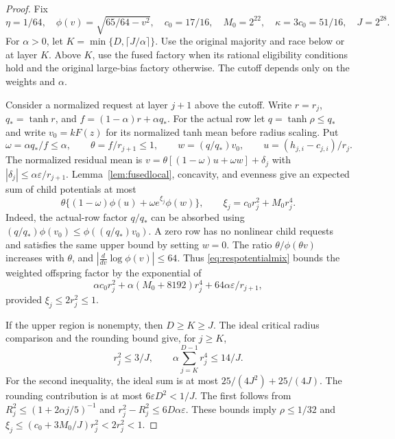 \begin{proof}
Fix
\[
\eta=1/64,\quad \phi(v)=\sqrt{65/64-v^2},\quad
c_0=17/16,\quad M_0=2^{22},\quad
\kappa=3c_0=51/16,\quad J=2^{28}.
\]
For $\alpha>0$, let $K=\min\{D,\lceil J/\alpha\rceil\}$.
Use the original majority and race below or at layer $K$.
Above $K$, use the fused factory when its rational eligibility
conditions hold and the original large-bias factory otherwise.
The cutoff depends only on the weights and $\alpha$.

Consider a normalized request at layer $j+1$ above the cutoff.
Write $r=r_j$, $q_*=\tanh r$, and
$f=(1-\alpha)r+\alpha q_*$. For the actual row let
$q=\tanh\rho\le q_*$ and write
$v_0=kF(z)$ for its normalized tanh mean before radius scaling.
Put
\[
\omega=\alpha q_*/f\le\alpha,\qquad
\theta=f/r_{j+1}\le1,\qquad
w=(q/q_*)v_0,\qquad
u=(h_{j,i}-c_{j,i})/r_j.
\]
The normalized residual mean is
$v=\theta[(1-\omega)u+\omega w]+\delta_j$ with
$|\delta_j|\le\alpha\varepsilon/r_{j+1}$.
Lemma~\ref{lem:fusedlocal}, concavity, and evenness give an
expected sum of child potentials at most
\[
\theta\{(1-\omega)\phi(u)+\omega e^{\xi_j}\phi(w)\},
\qquad
\xi_j=c_0r_j^2+M_0r_j^4.
\]
Indeed, the actual-row factor $q/q_*$ can be absorbed using
$(q/q_*)\phi(v_0)\le\phi((q/q_*)v_0)$.
A zero row has no nonlinear child requests and satisfies the
same upper bound by setting $w=0$.
The ratio $\theta/\phi(\theta v)$ increases with $\theta$,
and $|\frac d{dv}\log\phi(v)|\le64$.
Thus \eqref{eq:respotentialmix} bounds the weighted offspring
factor by the exponential of
\begin{equation}\label{eq:resweightedlocal}
\alpha c_0r_j^2+
\alpha(M_0+8192)r_j^4+
64\alpha\varepsilon/r_{j+1},
\end{equation}
provided $\xi_j\le2r_j^2\le1$.

If the upper region is nonempty, then $D\ge K\ge J$.
The ideal critical radius comparison and the rounding bound give,
for $j\ge K$,
\begin{equation}\label{eq:rescutoffbounds}
r_j^2\le3/J,
\qquad
\alpha\sum_{j=K}^{D-1}r_j^4\le14/J.
\end{equation}
For the second inequality, the ideal sum is at most
$25/(4J^2)+25/(4J)$. The rounding contribution is at most
$6\varepsilon D^2<1/J$. The first follows from
$R_j^2\le(1+2\alpha j/5)^{-1}$ and
$r_j^2-R_j^2\le6D\alpha\varepsilon$.
These bounds imply $\rho\le1/32$ and
$\xi_j\le(c_0+3M_0/J)r_j^2<2r_j^2<1$.


\end{proof}
